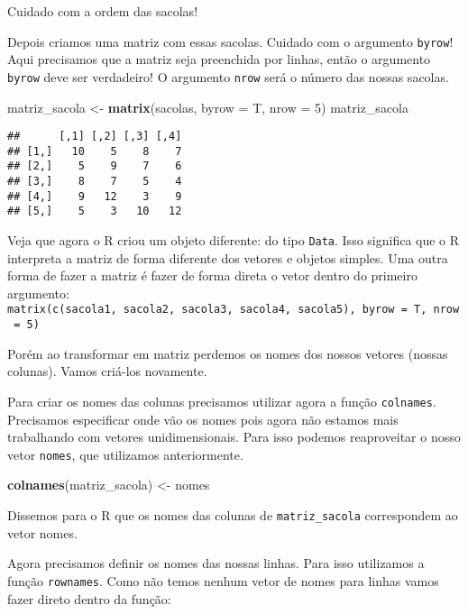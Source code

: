 \documentclass[]{book}
\newenvironment{Shaded}{\begin{snugshade}}{\end{snugshade}}
\newcommand{\DataTypeTok}[1]{\textcolor[rgb]{0.13,0.29,0.53}{#1}}
\newcommand{\DecValTok}[1]{\textcolor[rgb]{0.00,0.00,0.81}{#1}}
\newcommand{\KeywordTok}[1]{\textcolor[rgb]{0.13,0.29,0.53}{\textbf{#1}}}
\newcommand{\NormalTok}[1]{#1}
\newcommand{\StringTok}[1]{\textcolor[rgb]{0.31,0.60,0.02}{#1}}
\theoremstyle{definition}
\theoremstyle{definition}
\theoremstyle{definition}
\theoremstyle{remark}
\begin{document}
Cuidado com a ordem das sacolas!

Depois criamos uma matriz com essas sacolas. Cuidado com o argumento \texttt{byrow}! Aqui precisamos que a matriz seja preenchida por linhas, então o argumento \texttt{byrow} deve ser verdadeiro! O argumento \texttt{nrow} será o número das nossas sacolas.

\begin{Shaded}
\begin{Highlighting}[]
\NormalTok{matriz_sacola <-}\StringTok{ }\KeywordTok{matrix}\NormalTok{(sacolas, }\DataTypeTok{byrow =}\NormalTok{ T, }\DataTypeTok{nrow =} \DecValTok{5}\NormalTok{)}
\NormalTok{matriz_sacola}
\end{Highlighting}
\end{Shaded}

\begin{verbatim}
##      [,1] [,2] [,3] [,4]
## [1,]   10    5    8    7
## [2,]    5    9    7    6
## [3,]    8    7    5    4
## [4,]    9   12    3    9
## [5,]    5    3   10   12
\end{verbatim}

Veja que agora o R criou um objeto diferente: do tipo \texttt{Data}. Isso significa que o R interpreta a matriz de forma diferente dos vetores e objetos simples. Uma outra forma de fazer a matriz é fazer de forma direta o vetor dentro do primeiro argumento: \texttt{matrix(c(sacola1,\ sacola2,\ sacola3,\ sacola4,\ sacola5),\ byrow\ =\ T,\ nrow\ =\ 5)}

Porém ao transformar em matriz perdemos os nomes dos nossos vetores (nossas colunas). Vamos criá-los novamente.

Para criar os nomes das colunas precisamos utilizar agora a função \texttt{colnames}. Precisamos especificar onde vão os nomes pois agora não estamos mais trabalhando com vetores unidimensionais. Para isso podemos reaproveitar o nosso vetor \texttt{nomes}, que utilizamos anteriormente.

\begin{Shaded}
\begin{Highlighting}[]
\KeywordTok{colnames}\NormalTok{(matriz_sacola) <-}\StringTok{ }\NormalTok{nomes}
\end{Highlighting}
\end{Shaded}

Dissemos para o R que os nomes das colunas de \texttt{matriz\_sacola} correspondem ao vetor nomes.

Agora precisamos definir os nomes das nossas linhas. Para isso utilizamos a função \texttt{rownames}. Como não temos nenhum vetor de nomes para linhas vamos fazer direto dentro da função:
\end{document}
